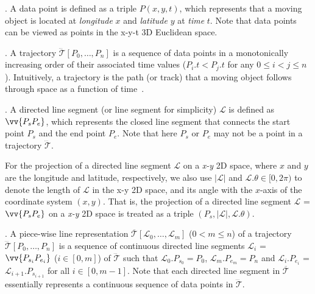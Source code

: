 . A data point is defined as a triple $P(x, y, t)$, which represents that a moving object is located at {\em longitude} $x$ and {\em latitude} $y$ at {\em time} $t$. Note that data points can be viewed as points in the x-y-t 3D Euclidean space.

. A trajectory $\dddot{\mathcal{T}}[P_0, \ldots, P_n]$ is a sequence of data points in a monotonically increasing order of their associated time values (\ie $P_i.t < P_j.t$ for any $0\le i<j\le n$). Intuitively, a trajectory is the path (or track) that a moving object follows through space as a function of time~\cite{physics-trajectory}.


. A directed line segment (or line segment for simplicity) $\mathcal{L}$ is defined as $\vv{P_{s}P_{e}}$, which represents the closed line segment that connects the start point $P_s$ and the end point $P_e$.
Note that here $P_s$ or $P_e$ may not be a point in a trajectory $\dddot{\mathcal{T}}$.


For the projection of a directed line segment $\mathcal{L}$ on a \emph{x-y} 2D space, where $x$ and $y$ are the longitude and latitude, respectively, we also use $|\mathcal{L}|$ and $\mathcal{L}.\theta\in [0, 2\pi)$ to denote the length of $\mathcal{L}$ in the x-y 2D space, and its angle with the $x$-axis of the coordinate system $(x, y)$.  That is, the projection of a directed line segment $\mathcal{L}$ = $\vv{P_{s}P_{e}}$ on a \emph{x-y} 2D space is treated as a triple $(P_s, |\mathcal{L}|, \mathcal{L}.\theta)$.


. A piece-wise line representation $\overline{\mathcal{T}}[\mathcal{L}_0, \ldots , \mathcal{L}_m]$ ($0< m \le n$) of a trajectory $\dddot{\mathcal{T}}[P_0, \ldots, P_n]$ is a sequence of continuous directed line segments $\mathcal{L}_{i}$ = $\vv{P_{s_i}P_{e_i}}$ ($i\in[0,m]$) of $\dddot{\mathcal{T}}$  such that $\mathcal{L}_{0}.P_{s_0} = P_0$, $\mathcal{L}_{m}.P_{e_m} = P_n$ and  $\mathcal{L}_{i}.P_{e_i}$ = $\mathcal{L}_{i+1}.P_{s_{i+1}}$ for all $i\in[0, m-1]$. Note that each directed line segment in $\overline{\mathcal{T}}$ essentially represents a continuous sequence of data points in $\dddot{\mathcal{T}}$.

